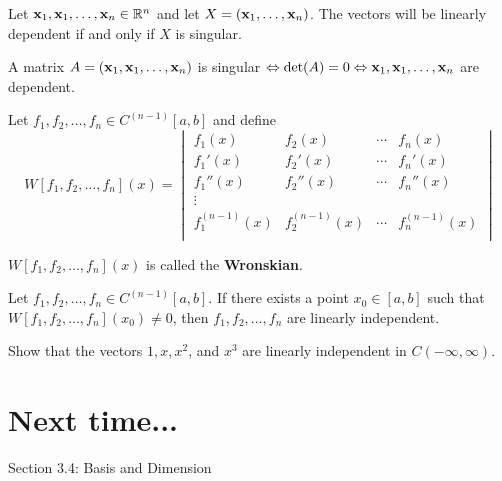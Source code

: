 \begin{theorem}
	Let ${\bf x}_1, {\bf x}_1, \dots, {\bf x}_n \in \mathbb{R}^n$ and let $X = ({\bf x}_1, \dots, {\bf x}_n)$.  The vectors will be linearly dependent if and only if $X$ is singular.
	
	
\end{theorem}




 \begin{tcolorbox}[colback=yellow!20!,colframe=gray!15!]

A matrix $A=({\bf x}_1, {\bf x}_1, \dots, {\bf x}_n )$ is singular $\Leftrightarrow  \det(A) =0  \Leftrightarrow {\bf x}_1, {\bf x}_1, \dots, {\bf x}_n $ are  dependent.  

 \end{tcolorbox}











 \begin{tcolorbox}[colback=yellow!10!,colframe=gray!15!]


\begin{definition}
	Let $f_1, f_2, \dots, f_n \in C^{(n-1)}[a,b]$ and define 
	\[  W[f_1, f_2, \dots, f_n](x) = 
	\begin{vmatrix} 
		f_1(x) & f_2(x) & \cdots & f_n(x) \\
		f_1'(x) & f_2'(x) & \cdots & f_n'(x) \\
		f_1''(x) & f_2''(x) & \cdots & f_n''(x) \\
		\vdots 	&  	&  \\
		f_1^{(n-1)}(x) & f_2^{(n-1)}(x) & \cdots & f_n^{(n-1)}(x) \\
	\end{vmatrix}  \]
	
	$W[f_1, f_2, \dots, f_n](x) $ is called the \textbf{Wronskian}.
\end{definition}
 \end{tcolorbox}







\begin{theorem}
	Let $f_1, f_2, \dots, f_n \in C^{(n-1)}[a,b]$.  If there exists a point $x_0 \in [a,b]$ such that $W[f_1, f_2, \dots, f_n](x_0) \ne 0$, then $f_1, f_2, \dots, f_n $ are linearly independent.
\end{theorem}








\begin{example}
	Show that the vectors $1, x, x^2$, and $x^3$ are linearly independent in $C(-\infty, \infty)$.  
\end{example}





\section*{Next time...}
Section 3.4: Basis and Dimension

